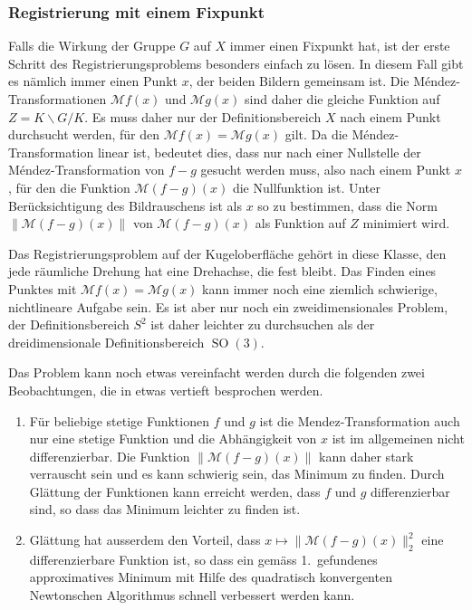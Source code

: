 %
%
\subsubsection{Registrierung mit einem Fixpunkt}


Falls die Wirkung der Gruppe $G$ auf $X$ immer einen Fixpunkt hat,
ist der erste Schritt des Registrierungsproblems besonders einfach
zu lösen.
In diesem Fall gibt es nämlich immer einen Punkt $x$, der beiden
Bildern gemeinsam ist.
Die Méndez-Transformationen $\mathcal{M}f(x)$ und $\mathcal{M}g(x)$
sind daher die gleiche Funktion auf $Z=K\backslash G/K$.
Es muss daher nur der Definitionsbereich $X$ nach einem Punkt
durchsucht werden, für den $\mathcal{M}f(x) = \mathcal{M}g(x)$
gilt.
Da die Méndez-Transformation linear ist, bedeutet dies, dass nur
nach einer Nullstelle der Méndez-Transformation von $f-g$ gesucht
werden muss, also nach einem Punkt $x$, für den die Funktion
\(
\mathcal{M}(f-g)(x)
\)
die Nullfunktion ist.
Unter Berücksichtigung des Bildrauschens ist als $x$ so zu bestimmen,
dass die Norm $\| \mathcal{M}(f-g)(x) \|$ von $\mathcal{M}(f-g)(x)$
als Funktion auf $Z$ minimiert wird.

Das Registrierungsproblem auf der Kugeloberfläche gehört in diese
Klasse, den jede räumliche Drehung hat eine Drehachse, die fest
bleibt.
Das Finden eines Punktes mit $\mathcal{M}f(x)=\mathcal{M}g(x)$ 
kann immer noch eine ziemlich schwierige, nichtlineare Aufgabe sein.
Es ist aber nur noch ein zweidimensionales Problem, der Definitionsbereich
$S^2$ ist daher leichter zu durchsuchen als der dreidimensionale
Definitionsbereich $\operatorname{SO}(3)$.

Das Problem kann noch etwas vereinfacht werden durch die folgenden zwei
Beobachtungen, die in \cite{buch:mendez-mueller} etwas vertieft besprochen
werden.
\begin{enumerate}
\item
Für beliebige stetige Funktionen $f$ und $g$ ist die
Mendez-Transformation auch nur eine stetige Funktion und die
Abhängigkeit von $x$ ist im allgemeinen nicht differenzierbar.
Die Funktion $\|\mathcal{M}(f-g)(x)\|$ kann daher stark verrauscht
sein und es kann schwierig sein, das Minimum zu finden.
Durch Glättung der Funktionen kann erreicht werden, dass $f$ und $g$
differenzierbar sind, so dass das Minimum leichter zu finden ist.
\item
Glättung hat ausserdem den Vorteil, dass $x\mapsto\|\mathcal{M}(f-g)(x)\|_2^2$
eine differenzierbare Funktion ist, so dass ein gemäss 1.~gefundenes
approximatives Minimum mit Hilfe des quadratisch konvergenten Newtonschen
Algorithmus schnell verbessert werden kann.
\end{enumerate}


